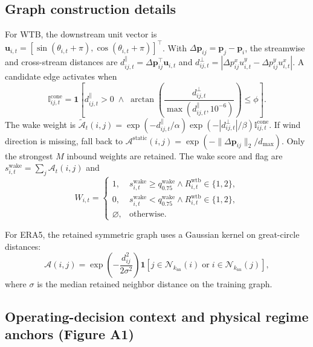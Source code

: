 \documentclass[
  journal]{IEEEtran}
\begin{document}
\FloatBarrier

\subsection*{Graph construction
details}\label{graph-construction-details}

For WTB, the downstream unit vector is
\(\mathbf{u}_{i,t}=[\sin(\theta_{i,t}+\pi), \cos(\theta_{i,t}+\pi)]^{\top}\).
With \(\Delta\mathbf{p}_{ij}=\mathbf{p}_j-\mathbf{p}_i\), the streamwise
and cross-stream distances are
\(d^{\parallel}_{ij,t}=\Delta\mathbf{p}_{ij}^{\top}\mathbf{u}_{i,t}\)
and
\(d^{\perp}_{ij,t}=|\Delta p^x_{ij}u^y_{i,t}-\Delta p^y_{ij}u^x_{i,t}|\).
A candidate edge activates when
\[\mathbb{I}^{\mathrm{cone}}_{ij,t}=\mathbf{1}\!\left[d^{\parallel}_{ij,t}>0\;\land\;\arctan\!\left(\frac{d^{\perp}_{ij,t}}{\max(d^{\parallel}_{ij,t},10^{-6})}\right)\le\phi\right].\]
The wake weight is
\(\tilde{\mathcal{A}}_t(i,j)=\exp(-d^{\parallel}_{ij,t}/\alpha)\exp(-|d^{\perp}_{ij,t}|/\beta)\mathbb{I}^{\mathrm{cone}}_{ij,t}\).
If wind direction is missing, fall back to
\(\mathcal{A}^{\mathrm{static}}(i,j)=\exp(-\lVert\Delta\mathbf{p}_{ij}\rVert_2/d_{\max})\).
Only the strongest \(M\) inbound weights are retained. The wake score
and flag are \(s^{\mathrm{wake}}_{i,t}=\sum_{j}\mathcal{A}_t(i,j)\) and
\[W_{i,t}=\begin{cases}1,&s^{\mathrm{wake}}_{i,t}\ge q_{0.75}^{\mathrm{wake}}\land R^{\mathrm{wtb}}_{i,t}\in\{1,2\},\\0,&s^{\mathrm{wake}}_{i,t}<q_{0.75}^{\mathrm{wake}}\land R^{\mathrm{wtb}}_{i,t}\in\{1,2\},\\\varnothing,&\text{otherwise.}\end{cases}\]

For ERA5, the retained symmetric graph uses a Gaussian kernel on
great-circle distances:
\[\mathcal{A}(i,j)=\exp\!\left(-\frac{d_{ij}^2}{2\sigma^2}\right)\mathbf{1}[j\in\mathcal{N}_{k_{\mathrm{nn}}}(i)\;\text{or}\;i\in\mathcal{N}_{k_{\mathrm{nn}}}(j)],\]
where \(\sigma\) is the median retained neighbor distance on the
training graph.

\FloatBarrier

\subsection*{Operating-decision context and physical regime anchors
(Figure
A1)}\label{operating-decision-context-and-physical-regime-anchors-figure-a1}
\end{document}
